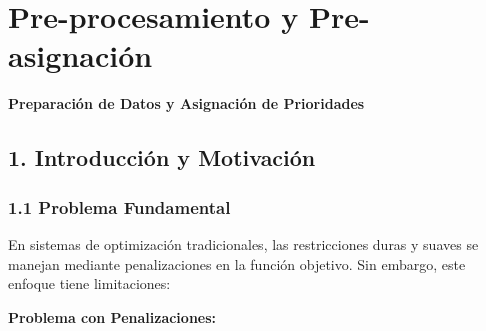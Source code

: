 \section{Pre-procesamiento y Pre-asignación}

\textbf{Preparación de Datos y Asignación de Prioridades}


\subsection{1. Introducción y Motivación}


\subsubsection{1.1 Problema Fundamental}

En sistemas de optimización tradicionales, las restricciones duras y suaves se manejan mediante penalizaciones en la función objetivo. Sin embargo, este enfoque tiene limitaciones:

\textbf{Problema con Penalizaciones:}

